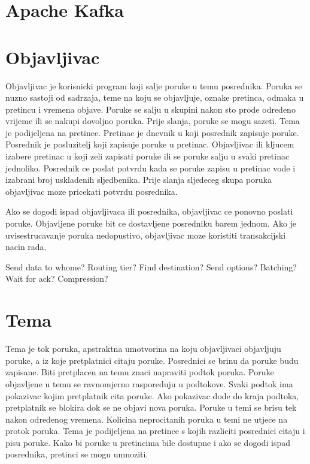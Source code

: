 \documentclass[times, utf8, diplomski, numeric]{fer}
\begin{document}
\chapter{Apache Kafka}



\chapter{Objavljivac}
Objavljivac je korisnicki program koji salje poruke u temu posrednika. Poruka se nuzno sastoji od sadrzaja, teme na koju se objavljuje, oznake pretinca, odmaka u pretincu i vremena objave. Poruke se salju u skupini nakon sto prode odredeno vrijeme ili se nakupi dovoljno poruka. Prije slanja, poruke se mogu sazeti. Tema je podijeljena na pretince. Pretinac je dnevnik u koji posrednik zapisuje poruke. Posrednik je posluzitelj koji zapisuje poruke u pretinac. Objavljivac ili kljucem izabere pretinac u koji zeli zapisati poruke ili se poruke salju u svaki pretinac jednoliko. Posrednik ce poslat potvrdu kada se poruke zapisu u pretinac vode i izabrani broj uskladenih sljedbenika. Prije slanja sljedeceg skupa poruka objavljivac moze pricekati potvrdu posrednika. 

Ako se dogodi ispad objavljivaca ili posrednika, objavljivac ce ponovno poslati poruke. Objavljene poruke bit ce dostavljene posredniku barem jednom. Ako je uvisestrucavanje poruka nedopustivo, objavljivac moze koristiti transakcijski nacin rada. 

Send data to whome?
Routing tier?
Find destination?
Send options?
Batching?
Wait for ack?
Compression?


\chapter{Tema}
Tema je tok poruka, apstraktna umotvorina na koju objavljivaci objavljuju poruke, a iz koje pretplatnici citaju poruke. Posrednici se brinu da poruke budu zapisane. Biti pretplacen na temu znaci napraviti podtok poruka. Poruke objavljene u temu se ravnomjerno rasporeduju u podtokove. Svaki podtok ima pokazivac kojim pretplatnik cita poruke. Ako pokazivac dode do kraja podtoka, pretplatnik se blokira dok se ne objavi nova poruka. Poruke u temi se brisu tek nakon odredenog vremena. Kolicina neprocitanih poruka u temi ne utjece na protok poruka. Tema je podijeljena na pretince s kojih razliciti posrednici citaju i pisu poruke. Kako bi poruke u pretincima bile dostupne i ako se dogodi ispad posrednika, pretinci se mogu umnoziti.
\end{document}
